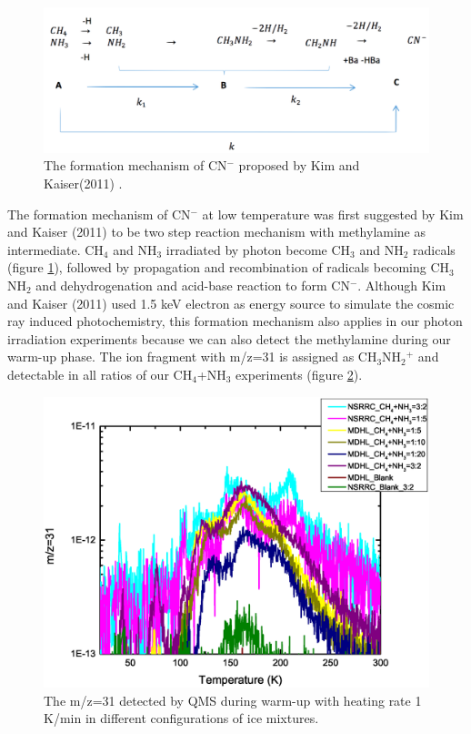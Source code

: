 \begin{figure}
\centering
\includegraphics[width=\textwidth]{figures/chapter3/CNmechanism}
\caption{The formation mechanism of CN$^-$ proposed by Kim and Kaiser(2011)\cite{kim} .}
\label{fig:CNmechanism}
\end{figure}

The formation mechanism of CN$^-$ at low temperature was first suggested by Kim and Kaiser (2011) \cite{kim} to be two step reaction mechanism with methylamine as intermediate. CH$_4$ and NH$_3$ irradiated by photon become CH$_3$ and NH$_2$ radicals (figure \ref{fig:CNmechanism}), followed by propagation and recombination of radicals becoming CH$_3$NH$_2$ and dehydrogenation and acid-base reaction to form CN$^-$.
Although Kim and Kaiser (2011) \cite{kim} used 1.5 keV electron as energy source to simulate the cosmic ray induced photochemistry, this formation mechanism also applies in our photon irradiation experiments because we can also detect the methylamine during our warm-up phase. The ion fragment with m/z=31 is assigned as CH$_3$NH$_2$$^+$ and detectable in all ratios of our CH$_4$+NH$_3$ experiments (figure \ref{Mass31}).

\begin{figure}
\centering
\includegraphics[width=\textwidth]{figures/chapter3/mass31.eps}
\caption{The m/z=31 detected by QMS during warm-up with heating rate 1 K/min in different configurations of ice mixtures.}
\label{Mass31}
\end{figure}

